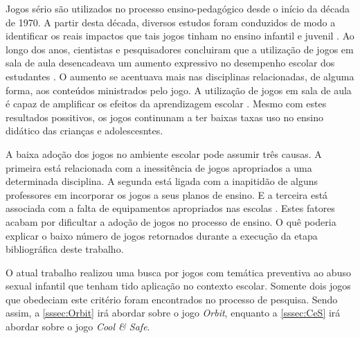 Jogos sério são utilizados no processo ensino-pedagógico desde o início da década de 1970. A partir desta década, diversos estudos foram conduzidos de modo a identificar os reais impactos que tais jogos tinham no ensino infantil e juvenil \cite{stieler2016paper}. Ao longo dos anos, cientistas e pesquisadores concluiram que a utilização de jogos em sala de aula desencadeava um aumento expressivo no desempenho escolar dos estudantes \cite{wentzel1998social}. O aumento se acentuava mais nas disciplinas relacionadas, de alguma forma, aos conteúdos ministrados pelo jogo. A utilização de jogos em sala de aula é capaz de amplificar os efeitos da aprendizagem escolar \cite{jones2020serious}. Mesmo com estes resultados possitivos, os jogos continunam a ter baixas taxas uso no ensino didático das crianças e adolescesntes. 


A baixa adoção dos jogos no ambiente escolar pode assumir três causas. A primeira está relacionada com a inessitência de jogos apropriados a uma determinada disciplina. A segunda está ligada com a inapitidão de alguns professores em incorporar os jogos a seus planos de ensino. E a terceira está associada com a falta de equipamentos apropriados nas escolas \cite{dip2016advancing}. Estes fatores acabam por dificultar a adoção de jogos no processo de ensino. O quê poderia explicar o baixo número de jogos retornados durante a execução da etapa bibliográfica deste trabalho. 

O atual trabalho realizou uma busca por jogos com temática preventiva ao abuso sexual infantil que tenham tido aplicação no contexto escolar. Somente dois jogos que obedeciam este critério foram encontrados no processo de pesquisa. Sendo assim, a \autoref{sssec:Orbit} irá abordar sobre o jogo \textit{Orbit}, enquanto a \autoref{sssec:CeS} irá abordar sobre o jogo \textit{Cool \& Safe}.





